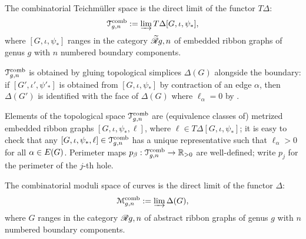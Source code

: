 \begin{definition}
  The combinatorial Teichm\"uller space is the direct limit of the
  functor $T\Delta$:%
  \begin{equation*}
    \mathcal{T}\sp{\text{comb}}_{g,n} := \varinjlim T\Delta[G, \iota, \psi_*],
  \end{equation*}
  where $[G, \iota, \psi_*]$ ranges in the category $\mathscr{\widetilde R}_{}{g,n}$ of embedded
  ribbon graphs of genus $g$ with $n$ numbered boundary components.
\end{definition}
$\mathcal{T}\sp{\text{comb}}_{g,n}$ is obtained by gluing topological simplices $\Delta(G)$ alongside
the boundary: if $[G', \iota', \psi'_*]$ is obtained from $[G, \iota, \psi_*]$ by
contraction of an edge $\alpha$, then $\Delta(G')$ is identified with the face
of $\Delta(G)$ where $\ell_\alpha = 0$ by .

Elements of the topological space $\mathcal{T}\sp{\text{comb}}_{g,n}$ are (equivalence
classes of) metrized embedded ribbon graphs $[G, \iota, \psi_*, \ell]$, where $\ell
\in T\Delta[G, \iota, \psi_*]$; it is easy to check that any $[G, \iota, \psi_*, \ell] \in
\mathcal{T}\sp{\text{comb}}_{g,n}$ has a unique representative such that $\ell_\alpha > 0$ for all
$\alpha \in E(G)$.  Perimeter maps $p_\beta: \mathcal{T}\sp{\text{comb}}_{g,n} \to \mathbb{R}_{>0}$ are
well-defined; write $p_j$ for the perimeter of the $j$-th hole.

\begin{definition}
  The combinatorial moduli space of curves is the direct limit of the
  functor $\Delta$:
  \begin{equation*}
    \mathcal{M}\sp{\text{comb}}_{g,n} := \varinjlim \Delta(G),
  \end{equation*}
  where $G$ ranges in the category $\mathscr{R}_{}{g,n}$ of abstract ribbon
  graphs of genus $g$ with $n$ numbered boundary components.
\end{definition}

